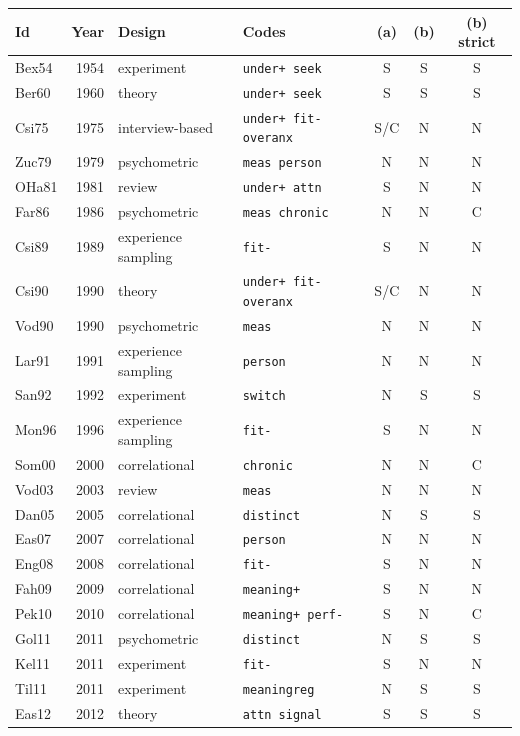 {\footnotesize\setlength{\tabcolsep}{3pt}
\begin{longtable}{@{}lrllccc@{}}
\toprule
Id & Year & Design & Codes & (a) & (b) & (b) strict \\
\midrule\endhead
\bottomrule\endfoot
Bex54 & 1954 & experiment & \texttt{under+ seek} & S & S & S \\
Ber60 & 1960 & theory & \texttt{under+ seek} & S & S & S \\
Csi75 & 1975 & interview-based & \texttt{under+ fit- overanx} & S/C & N & N \\
Zuc79 & 1979 & psychometric & \texttt{meas person} & N & N & N \\
OHa81 & 1981 & review & \texttt{under+ attn} & S & N & N \\
Far86 & 1986 & psychometric & \texttt{meas chronic} & N & N & C \\
Csi89 & 1989 & experience sampling & \texttt{fit-} & S & N & N \\
Csi90 & 1990 & theory & \texttt{under+ fit- overanx} & S/C & N & N \\
Vod90 & 1990 & psychometric & \texttt{meas} & N & N & N \\
Lar91 & 1991 & experience sampling & \texttt{person} & N & N & N \\
San92 & 1992 & experiment & \texttt{switch} & N & S & S \\
Mon96 & 1996 & experience sampling & \texttt{fit-} & S & N & N \\
Som00 & 2000 & correlational & \texttt{chronic} & N & N & C \\
Vod03 & 2003 & review & \texttt{meas} & N & N & N \\
Dan05 & 2005 & correlational & \texttt{distinct} & N & S & S \\
Eas07 & 2007 & correlational & \texttt{person} & N & N & N \\
Eng08 & 2008 & correlational & \texttt{fit-} & S & N & N \\
Fah09 & 2009 & correlational & \texttt{meaning+} & S & N & N \\
Pek10 & 2010 & correlational & \texttt{meaning+ perf-} & S & N & C \\
Gol11 & 2011 & psychometric & \texttt{distinct} & N & S & S \\
Kel11 & 2011 & experiment & \texttt{fit-} & S & N & N \\
Til11 & 2011 & experiment & \texttt{meaningreg} & N & S & S \\
Eas12 & 2012 & theory & \texttt{attn signal} & S & S & S \\

\end{longtable}}
